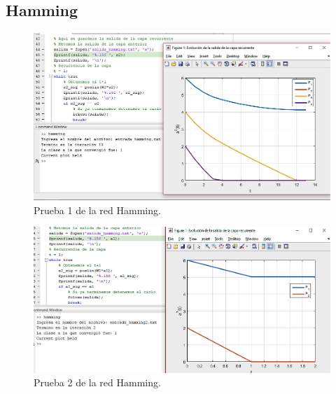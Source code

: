\documentclass[12pt, titlepage]{article}
\begin{document}
        \subsection{Hamming}
            \begin{figure}[H]
                \begin{center}
                    \includegraphics[width=16cm]{img/hamming/hamming1.png}
                    \caption{Prueba 1 de la red Hamming.}
                    \label{fig:hamming1}
                \end{center}
            \end{figure}
        
            \begin{figure}[H]
                \begin{center}
                    \includegraphics[width=16cm]{img/hamming/hamming2.png}
                    \caption{Prueba 2 de la red Hamming.}
                    \label{fig:hamming2}
                \end{center}
            \end{figure}
        
\end{document}
